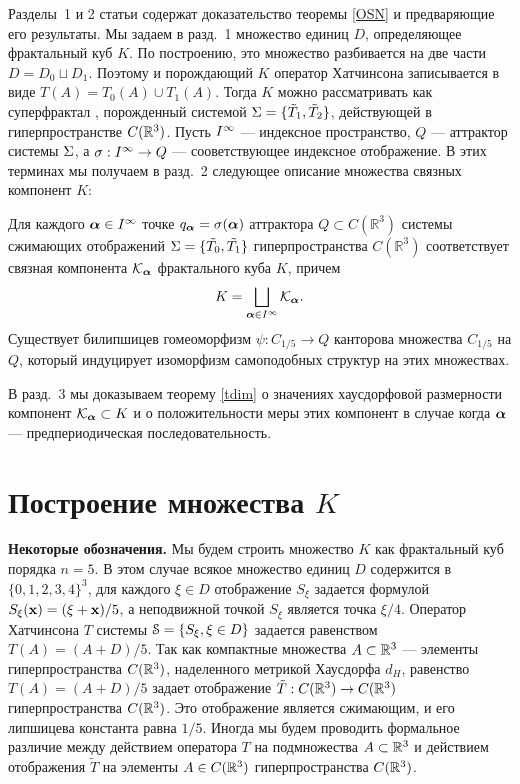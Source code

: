 Разделы~1 и 2 статьи содержат доказательство теоремы \ref{OSN} и предваряющие его результаты. 
Мы задаем в разд.~1 множество единиц $D$, определяющее  фрактальный куб  $K$. 
По построению, это множество  разбивается на две части $D= D_0\sqcup D_1$. Поэтому и порождающий $K$ оператор Хатчинсона записывается в виде $T(A)=T_0(A)\cup T_1(A)$.  
Тогда $K$ можно рассматривать как суперфрактал \cite[Definition 18]{SF}, порожденный системой $\Sigma=\{\tilde T_1, \tilde T_2\}$, действующей в гиперпространстве $C(\mathbb{R}^3)$. Пусть $I^\infty$ --- индексное пространство,    $Q$ --- аттрактор системы $\Sigma$, а $\sigma:I^\infty\to Q$ --- сооветствующее  индексное отображение. 
В этих терминах мы получаем в разд.~2 следующее описание множества связных компонент $K$:
\begin{theorem}\label{GGM}
Для каждого ${\bm{\alpha}}\in I^\infty$ точке  $q_{\bm{\alpha}}=\sigma({\bm{\alpha}})$ аттрактора $Q\subset C(\mathbb{R}^3)$ системы сжимающих отображений $\Sigma=\{\tilde{T_0},\tilde{T_1}\}$ гиперпространства $C(\mathbb{R}^3)$ соответствует  связная компонента ${\mathcal K}_{\bm{\alpha}}$ фрактального куба $K$,  причем 
$$K=\bigsqcup\limits_{{\bm{\alpha}}\in I^\infty} {\mathcal K}_{\bm{\alpha}}.$$ 
Существует билипшицев гомеоморфизм  $\psi: C_{1/5}\to Q$ канторова множества $C_{1/5}$ на $Q$, который индуцирует изоморфизм самоподобных структур на этих множествах.
\end{theorem}
В разд.~3 мы доказываем теорему \ref{tdim} о  значениях хаусдорфовой размерности компонент  ${\mathcal K}_{\bm{\alpha}}\subset K$ и о положительности меры этих компонент  в случае когда ${\bm{\alpha}}$ --- предпериодическая последовательность.




\section{Построение множества $K$}

{\bf Некоторые обозначения.} Мы будем строить множество $K$ как фрактальный куб порядка $n=5$.
В этом случае всякое множество единиц $ D$ содержится в $\{0,1,2,3,4\}^3$, для каждого  $\xi\in D$ отображение $S_\xi$ задается  формулой  $S_\xi({\bf{x}})=(\xi+{\bf{x}})/5$, а неподвижной точкой $S_\xi$ является точка $\xi/4$.
Оператор Хатчинсона $T$ системы ${\EuScript S}=\{S_\xi, \xi\in D\}$ задается равенством $T(A)=(A+ D)/{5}$.
Так как компактные множества $A\subset\mathbb{R}^3$ --- элементы гиперпространства $C(\mathbb{R}^3)$, наделенного метрикой Хаусдорфа $d_H$, равенство $T(A)=(A+ D)/{5}$ задает  отображение ${\tilde T}:C(\mathbb{R}^3)\to C(\mathbb{R}^3)$ гиперпространства $C(\mathbb{R}^3)$. 
Это отображение является сжимающим, и его липшицева константа равна $1/5$.
Иногда мы будем проводить формальное различие между действием оператора $T$ на подмножества $A\subset \mathbb{R}^3$  и действием отображения $\tilde T$ на элементы $A\in C(\mathbb{R}^3)$ гиперпространства $C(\mathbb{R}^3)$.\smallskip


